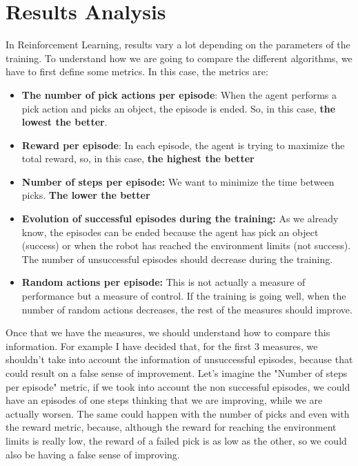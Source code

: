 \chapter{Results Analysis}



	In Reinforcement Learning, results vary a lot depending on the parameters of the training. To understand how we are going to compare the different algorithms, we have to first define some metrics. In this case, the metrics are:
	
	\begin{itemize}
		\item[\textendash]\textbf{The number of pick actions per episode}: When the agent performs a pick action and picks an object, the episode is ended. So, in this case, \textbf{the lowest the better}.
		\item[\textendash]\textbf{Reward per episode}: In each episode, the agent is trying to maximize the total reward, so, in this case, \textbf{the highest the better}
		\item[\textendash]\textbf{Number of steps per episode:} We want to minimize the time between picks. \textbf{The lower the better}
		\item[\textendash]\textbf{Evolution of successful episodes during the training:} As we already know, the episodes can be ended  because the agent has pick an object (success) or when the robot has reached the environment limits (not success). The number of unsuccessful episodes should decrease during the training.
		\item[\textendash]\textbf{Random actions per episode:} This is not actually a measure of performance but a measure of control. If the training is going well, when the number of random actions decreases, the rest of the measures should improve.
	\end{itemize}

	Once that we have the measures, we should understand how to compare this information. For example I have decided that, for the first 3 measures, we shouldn't take into account the information of unsuccessful episodes, because that could result on a false sense of improvement. Let's imagine the "Number of steps per episode" metric, if we took into account the non successful episodes, we could have an episodes of one steps thinking that we are improving, while we are actually worsen. The same could happen with the number of picks and even with the reward metric, because, although the reward for reaching the environment limits is really low, the reward of a failed pick is as low as the other, so we could also be having a false sense of improving.
	
